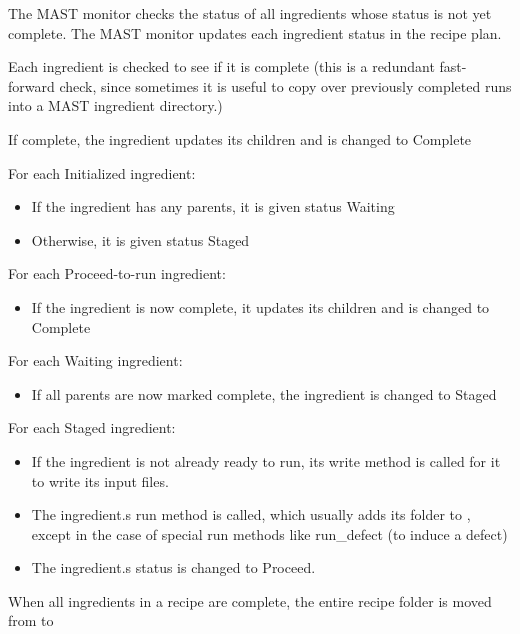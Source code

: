 \documentclass[letterpaper,10pt,english]{sphinxmanual}
\begin{document}
The MAST monitor checks the status of all ingredients whose status is not yet complete. The MAST monitor updates each ingredient status in the recipe plan.

Each ingredient is checked to see if it is complete (this is a redundant fast-forward check, since sometimes it is useful to copy over previously completed runs into a MAST ingredient directory.)

If complete, the ingredient updates its children and is changed to Complete

For each Initialized ingredient:
\begin{itemize}
\item {} 
If the ingredient has any parents, it is given status Waiting

\item {} 
Otherwise, it is given status Staged

\end{itemize}

For each Proceed-to-run ingredient:
\begin{itemize}
\item {} 
If the ingredient is now complete, it updates its children and is changed to Complete

\end{itemize}

For each Waiting ingredient:
\begin{itemize}
\item {} 
If all parents are now marked complete, the ingredient is changed to Staged

\end{itemize}

For each Staged ingredient:
\begin{itemize}
\item {} 
If the ingredient is not already ready to run, its write method is called for it to write its input files.

\item {} 
The ingredient.s run method is called, which usually adds its folder to , except in the case of special run methods like run\_defect (to induce a defect)

\item {} 
The ingredient.s status is changed to Proceed.

\end{itemize}

When all ingredients in a recipe are complete, the entire recipe folder is moved from  to 
\end{document}
